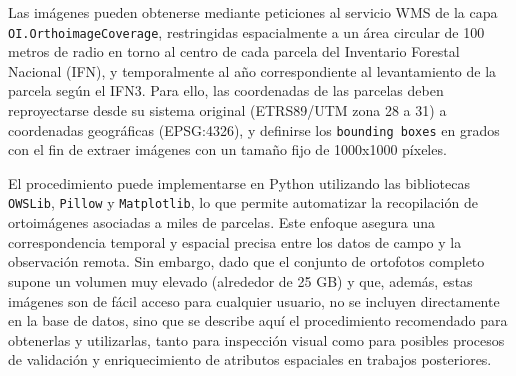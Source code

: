 Las imágenes pueden obtenerse mediante peticiones al servicio WMS de la capa \texttt{OI.OrthoimageCoverage}, restringidas espacialmente a un área circular de 100 metros de radio en torno al centro de cada parcela del Inventario Forestal Nacional (IFN), y temporalmente al año correspondiente al levantamiento de la parcela según el IFN3. Para ello, las coordenadas de las parcelas deben reproyectarse desde su sistema original (ETRS89/UTM zona 28 a 31) a coordenadas geográficas (EPSG:4326), y definirse los \texttt{bounding boxes} en grados con el fin de extraer imágenes con un tamaño fijo de 1000x1000 píxeles.

El procedimiento puede implementarse en Python utilizando las bibliotecas \texttt{OWSLib}, \texttt{Pillow} y \texttt{Matplotlib}, lo que permite automatizar la recopilación de ortoimágenes asociadas a miles de parcelas. Este enfoque asegura una correspondencia temporal y espacial precisa entre los datos de campo y la observación remota. Sin embargo, dado que el conjunto de ortofotos completo supone un volumen muy elevado (alrededor de 25 GB) y que, además, estas imágenes son de fácil acceso para cualquier usuario, no se incluyen directamente en la base de datos, sino que se describe aquí el procedimiento recomendado para obtenerlas y utilizarlas, tanto para inspección visual como para posibles procesos de validación y enriquecimiento de atributos espaciales en trabajos posteriores.
